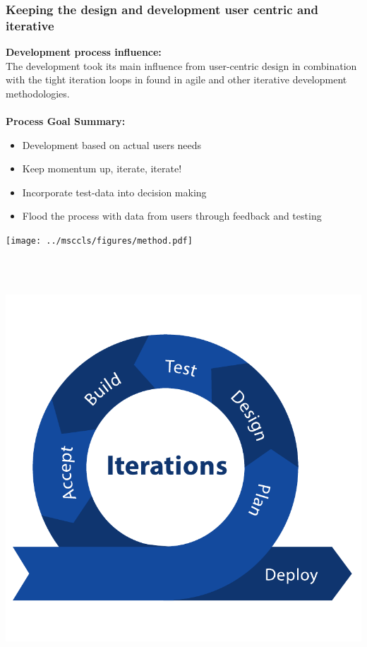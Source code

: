 \documentclass[xcolor=svgnames,10pt,aspectratio=1610]{beamer}
\begin{document}
\begin{frame}
  \frametitle{Keeping the design and development user centric and iterative}
  \begin{minipage}{.49\textwidth}
    \textbf{Development process influence:} \\
    The development took its main influence from user-centric design in
    combination with the tight iteration loops in found in agile and other
    iterative development methodologies. \\ \\
    \textbf{Process Goal Summary:}
    \begin{itemize}
      \item{Development based on actual users needs}
      \item{Keep momentum up, iterate, iterate!}
      \item{Incorporate test-data into decision making}
      \item{Flood the process with data from users through feedback and testing}
    \end{itemize}
  \end{minipage}
  \begin{minipage}{.49\textwidth}
    \begin{minipage}{\textwidth}
      \centering
      \texttt{[image: ../msccls/figures/method.pdf]}
    \end{minipage} \\
    \vspace{0.3cm} \\
    \begin{minipage}{\textwidth}
      \begin{minipage}{0.49\textwidth}
        \centering
        \includegraphics[width=1.1\textwidth]{img/iteration.pdf}

\end{minipage}
\end{minipage}
\end{minipage}
\end{frame}
\end{document}
